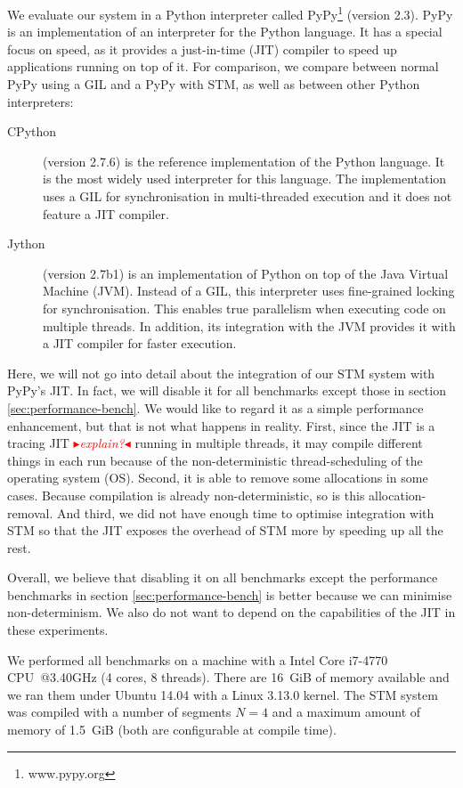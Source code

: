 \documentclass{sigplanconf}
\newcommand{\mynote}[2]{%
  \textcolor{red}{%
    \fbox{\bfseries\sffamily\scriptsize#1}%
    {\small$\blacktriangleright$\textsf{\emph{#2}}$\blacktriangleleft$}%
  }%
}
\newcommand\remi[1]{\mynote{Remi}{#1}}
\begin{document}
We evaluate our system in a Python interpreter called
PyPy\footnote{www.pypy.org} (version 2.3). PyPy is an implementation of an
interpreter for the Python language. It has a special focus on speed,
as it provides a just-in-time (JIT) compiler to speed up applications
running on top of it. For comparison, we compare between normal PyPy
using a GIL and a PyPy with STM, as well as between other Python interpreters:
\begin{description}
\item[CPython] (version 2.7.6) is the reference implementation of the Python
  language. It is the most widely used interpreter for this language.
  The implementation uses a GIL for synchronisation in multi-threaded
  execution and it does not feature a JIT compiler.
\item[Jython] (version 2.7b1) is an implementation of Python on top of
  the Java Virtual Machine (JVM). Instead of a GIL, this interpreter
  uses fine-grained locking for synchronisation. This enables true
  parallelism when executing code on multiple threads. In addition, its
  integration with the JVM provides it with a JIT compiler for faster
  execution.
\end{description}

Here, we will not go into detail about the integration of our STM
system with PyPy's JIT. In fact, we will disable it for all benchmarks
except those in section \ref{sec:performance-bench}. We would like to
regard it as a simple performance enhancement, but that is not what
happens in reality. First, since the JIT is a tracing
JIT\remi{explain?}  running in multiple threads, it may compile
different things in each run because of the non-deterministic
thread-scheduling of the operating system (OS). Second, it is able to
remove some allocations in some cases. Because compilation is already
non-deterministic, so is this allocation-removal. And third, we did
not have enough time to optimise integration with STM so that the JIT
exposes the overhead of STM more by speeding up all the rest.

Overall, we believe that disabling it on all benchmarks except the
performance benchmarks in section \ref{sec:performance-bench} is better
because we can minimise non-determinism. We also do not want to depend
on the capabilities of the JIT in these experiments.

We performed all benchmarks on a machine with a Intel Core i7-4770
CPU~@3.40GHz (4 cores, 8 threads).  There are 16~GiB of memory
available and we ran them under Ubuntu 14.04 with a Linux 3.13.0
kernel. The STM system was compiled with a number of segments $N=4$
and a maximum amount of memory of 1.5~GiB (both are configurable at
compile time).
\end{document}
